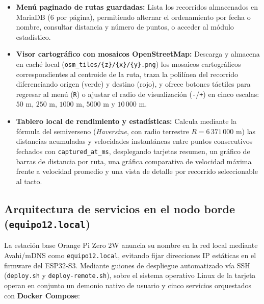 \documentclass[12pt, letterpaper]{article}
\begin{document}
\begin{itemize}
    \item \textbf{Menú paginado de rutas guardadas:} Lista los recorridos almacenados en MariaDB (6 por página), permitiendo alternar el ordenamiento por fecha o nombre, consultar distancia y número de puntos, o acceder al módulo estadístico.
    \item \textbf{Visor cartográfico con mosaicos OpenStreetMap:} Descarga y almacena en caché local (\texttt{osm\_tiles/\{z\}/\{x\}/\{y\}.png}) los mosaicos cartográficos correspondientes al centroide de la ruta, traza la polilínea del recorrido diferenciando origen (verde) y destino (rojo), y ofrece botones táctiles para regresar al menú (\texttt{R}) o ajustar el radio de visualización (\texttt{-}/\texttt{+}) en cinco escalas: $50\text{ m}$, $250\text{ m}$, $1000\text{ m}$, $5000\text{ m}$ y $10\,000\text{ m}$.
    \item \textbf{Tablero local de rendimiento y estadísticas:} Calcula mediante la fórmula del semiverseno (\textit{Haversine}, con radio terrestre $R = 6\,371\,000\text{ m}$) las distancias acumuladas y velocidades instantáneas entre puntos consecutivos fechados con \texttt{captured\_at\_ms}, desplegando tarjetas resumen, un gráfico de barras de distancia por ruta, una gráfica comparativa de velocidad máxima frente a velocidad promedio y una vista de detalle por recorrido seleccionable al tacto.
\end{itemize}

\subsection*{Arquitectura de servicios en el nodo borde (\texttt{equipo12.local})}

La estación base Orange Pi Zero 2W anuncia su nombre en la red local mediante Avahi/mDNS como \texttt{equipo12.local}, evitando fijar direcciones IP estáticas en el firmware del ESP32-S3. Mediante guiones de despliegue automatizado vía SSH (\texttt{deploy.sh} y \texttt{deploy-remote.sh}), sobre el sistema operativo Linux de la tarjeta operan en conjunto un demonio nativo de usuario y cinco servicios orquestados con \textbf{Docker Compose}:
\end{document}
